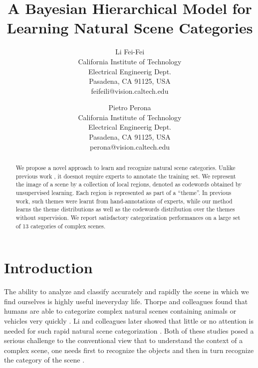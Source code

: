 \documentclass[10pt,a4paper,twocolumn]{article}
\begin{document}
\title{A Bayesian Hierarchical Model for Learning Natural Scene Categories}

\author{Li Fei-Fei\\
California Institute of Technology\\ Electrical Engineerig Dept.\\
Pasadena, CA 91125, USA\\
feifeili@vision.caltech.edu \and
Pietro Perona\\
California Institute of Technology\\ Electrical Engineerig Dept.\\
Pasadena, CA 91125, USA\\
perona@vision.caltech.edu}

\maketitle

\begin{abstract}
\hspace{.5cm}We propose a novel approach to learn and recognize natural scene categories. Unlike previous work \cite{oliva, vogel}, it doesnot require experts to annotate the training set. We represent the image of a scene by a collection of local regions, denoted as codewords obtained by unsupervised learning. Each region is represented as part of a “theme”. In previous work, such themes were learnt from hand-annotations of experts, while our method learns the theme distributions as well as the codewords distribution over the themes without supervision. We report satisfactory categorization performances on a large set of 13 categories of complex scenes.
\end{abstract}

\section{Introduction}
\hspace{.5cm}The ability to analyze and classify accurately and rapidly the scene in which we find ourselves is highly useful ineveryday life. Thorpe and colleagues found that humans are able to categorize complex natural scenes containing animals or vehicles very quickly \cite{fize}. Li and colleagues later showed that little or no attention is needed for such rapid natural scene categorization \cite{koch}. Both of these studies posed a serious challenge to the conventional view that to understand the context of a complex scene, one needs first to recognize the objects and then in turn recognize the category of the scene \cite{gelade}.\\
\end{document}
